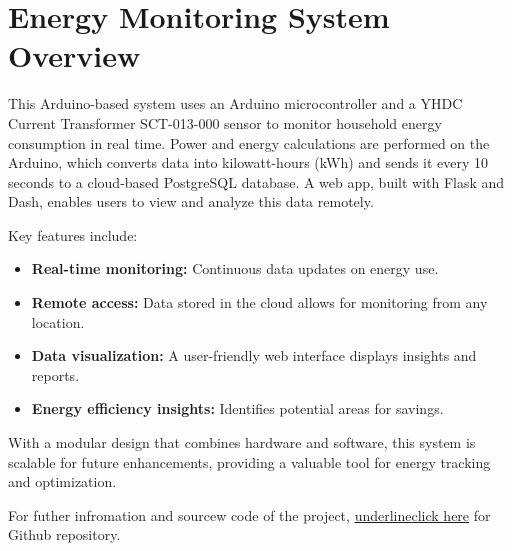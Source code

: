 \section{Energy Monitoring System Overview}

This Arduino-based system uses an Arduino microcontroller and a YHDC Current Transformer SCT-013-000 sensor to monitor household energy consumption in real time. Power and energy calculations are performed on the Arduino, which converts data into kilowatt-hours (kWh) and sends it every 10 seconds to a cloud-based PostgreSQL database. A web app, built with Flask and Dash, enables users to view and analyze this data remotely.

Key features include:
\begin{itemize}
    \item \textbf{Real-time monitoring:} Continuous data updates on energy use.
    \item \textbf{Remote access:} Data stored in the cloud allows for monitoring from any location.
    \item \textbf{Data visualization:} A user-friendly web interface displays insights and reports.
    \item \textbf{Energy efficiency insights:} Identifies potential areas for savings.
\end{itemize}

With a modular design that combines hardware and software, this system is scalable for future enhancements, providing a valuable tool for energy tracking and optimization.

For futher infromation and sourcew code of the project, \href{https://github.com/Jubel075/Energy-Monitor}{underline{click here}} for Github repository.
